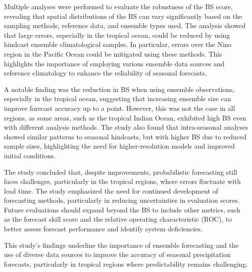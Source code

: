Multiple analyses were performed to evaluate the robustness of the BS score, revealing that spatial distributions of the BS can vary significantly based on the sampling methods, reference data, and ensemble types used. The analysis showed that large errors, especially in the tropical ocean, could be reduced by using hindcast ensemble climatological samples. In particular, errors over the Nino region in the Pacific Ocean could be mitigated using these methods. This highlights the importance of employing various ensemble data sources and reference climatology to enhance the reliability of seasonal forecasts.

A notable finding was the reduction in BS when using ensemble observations, especially in the tropical ocean, suggesting that increasing ensemble size can improve forecast accuracy up to a point. However, this was not the case in all regions, as some areas, such as the tropical Indian Ocean, exhibited high BS even with different analysis methods. The study also found that intra-seasonal analyses showed similar patterns to seasonal hindcasts, but with higher BS due to reduced sample sizes, highlighting the need for higher-resolution models and improved initial conditions.

The study concluded that, despite improvements, probabilistic forecasting still faces challenges, particularly in the tropical regions, where errors fluctuate with lead time. The study emphasized the need for continued development of forecasting methods, particularly in reducing uncertainties in evaluation scores. Future evaluations should expand beyond the BS to include other metrics, such as the forecast skill score and the relative operating characteristic (ROC), to better assess forecast performance and identify system deficiencies.

This study's findings underline the importance of ensemble forecasting and the use of diverse data sources to improve the accuracy of seasonal precipitation forecasts, particularly in tropical regions where predictability remains challenging.


